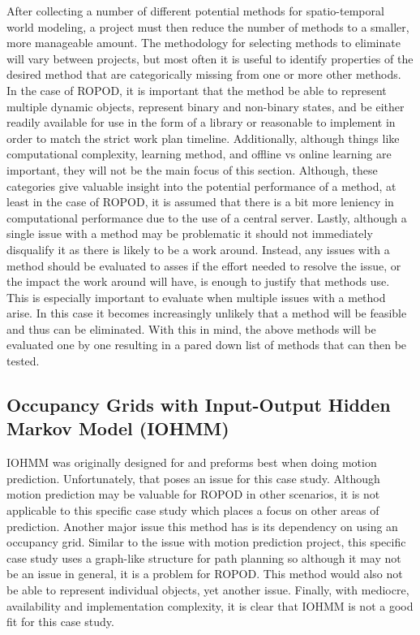   After collecting a number of different potential methods for spatio-temporal world
  modeling, a project must then reduce the number of methods to a smaller, more
  manageable amount. The methodology for selecting methods to eliminate will
  vary between projects, but most often it is useful to identify properties
  of the desired method that are categorically missing from one or more other
  methods. In the case of ROPOD, it is important that the method be able to
  represent multiple dynamic objects, represent binary and non-binary states,
  and be either readily available for use in the form of a library or reasonable to
  implement in order to match the strict work plan timeline. Additionally, although
  things like computational complexity, learning method, and offline vs online
  learning are important, they will not be the main focus of this section.
  Although, these categories give valuable insight into the potential performance
  of a method, at least in the case of ROPOD,
  it is assumed that there is a bit more leniency in computational performance
  due to the use of a central server.
  Lastly, although a single issue with a method may be problematic it should
  not immediately disqualify it as there is likely to be a work around. Instead,
  any issues with a method should be evaluated to asses if the effort needed
  to resolve the issue, or the impact the work around will have, is enough to
  justify that methods use. This is especially important to evaluate when
  multiple issues with a method arise. In this case it becomes increasingly
  unlikely that a method will be feasible and thus can be eliminated.
  With this in mind, the above methods will be
  evaluated one by one resulting in a pared down list of methods that can
  then be tested. \\

  \subsection { Occupancy Grids with Input-Output Hidden Markov Model (IOHMM) }
  IOHMM was originally designed for and preforms best when doing motion prediction.
  Unfortunately, that poses an issue for this case study. Although motion prediction
  may be valuable for ROPOD in other scenarios, it is not applicable to this specific case study
  which places a focus on other areas of prediction.
  Another major issue this method has is its
  dependency on using an occupancy grid. Similar to the issue with motion
  prediction project, this specific case study uses a graph-like structure for path
  planning so although it may not be an issue in general, it is a problem for ROPOD. This method would also not be able to represent individual objects,
  yet another issue. Finally, with mediocre, availability and
  implementation complexity, it is clear that IOHMM is not a good fit for this
  case study. \\

